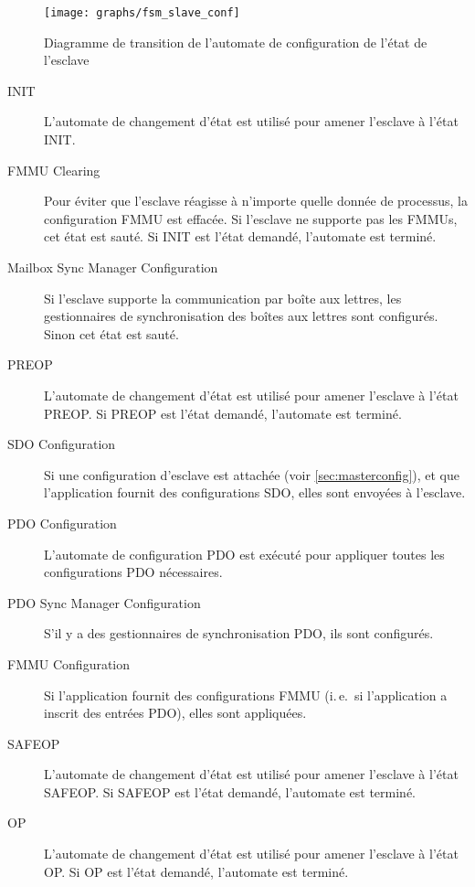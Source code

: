 \documentclass[a4paper,12pt,BCOR6mm,bibtotoc,idxtotoc]{scrbook}
\begin{document}
\begin{figure}[htbp]
  \centering
  \texttt{[image: graphs/fsm\_slave\_conf]}
  \caption{Diagramme de transition de l'automate de configuration de
    l'\'etat de l'esclave}
  \label{fig:fsm-slaveconf}
\end{figure}

\begin{description}

\item[INIT] L'automate de changement d'\'etat est utilis\'e pour
  amener l'esclave \`a l'\'etat INIT.

\item[FMMU Clearing] Pour \'eviter que l'esclave r\'eagisse \`a
  n'importe quelle donn\'ee de processus, la configuration FMMU est
  effac\'ee.  Si l'esclave ne supporte pas les FMMUs, cet \'etat est
  saut\'e.  Si INIT est l'\'etat demand\'e, l'automate est termin\'e.

\item[Mailbox Sync Manager Configuration] Si l'esclave supporte la
  communication par bo\^ite aux lettres, les gestionnaires de
  synchronisation des bo\^ites aux lettres sont configur\'es. Sinon
  cet \'etat est saut\'e.

\item[PREOP] L'automate de changement d'\'etat est utilis\'e pour amener
  l'esclave \`a l'\'etat PREOP. Si PREOP est l'\'etat demand\'e, l'automate
  est termin\'e.

\item[SDO Configuration] Si une configuration d'esclave est attach\'ee
  (voir \autoref{sec:masterconfig}), et que l'application fournit des
  configurations SDO, elles sont envoy\'ees \`a l'esclave.


\item[PDO Configuration] L'automate de configuration PDO est ex\'ecut\'e
  pour appliquer toutes les configurations PDO n\'ecessaires.

\item[PDO Sync Manager Configuration] S'il y a des gestionnaires
  de synchronisation PDO, ils sont configur\'es.

\item[FMMU Configuration] Si l'application fournit des configurations
  FMMU (i.\,e.\ si l'application a inscrit des entr\'ees PDO), elles
  sont appliqu\'ees.

\item[SAFEOP] L'automate de changement d'\'etat est utilis\'e pour
  amener l'esclave \`a l'\'etat SAFEOP. Si SAFEOP est l'\'etat
  demand\'e, l'automate est termin\'e.

\item[OP] L'automate de changement d'\'etat est utilis\'e pour
  amener l'esclave \`a l'\'etat OP. Si OP est l'\'etat demand\'e,
  l'automate est termin\'e.

\end{description}
\end{document}
